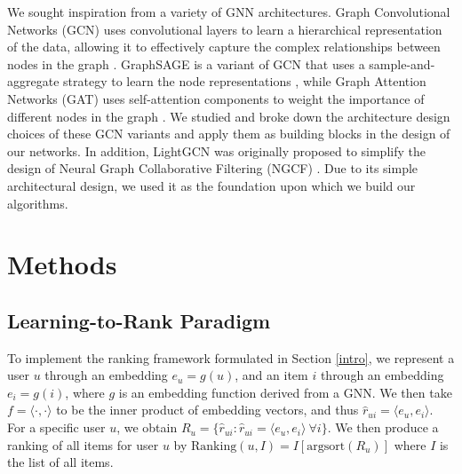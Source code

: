 \documentclass{article}
\begin{document}
We sought inspiration from a variety of GNN architectures. Graph Convolutional Networks (GCN) uses convolutional layers to learn a hierarchical representation of the data, allowing it to effectively capture the complex relationships between nodes in the graph \cite{gcn}. GraphSAGE is a variant of GCN that uses a sample-and-aggregate strategy to learn the node representations \cite{graphsage}, while Graph Attention Networks (GAT) uses self-attention components to weight the importance of different nodes in the graph \cite{gat}. We studied and broke down the architecture design choices of these GCN variants and apply them as building blocks in the design of our networks. In addition, LightGCN \cite{lightgcn} was originally proposed to simplify the design of Neural Graph Collaborative Filtering (NGCF) \cite{ngcf}. Due to its simple architectural design, we used it as the foundation upon which we build our algorithms.

\section{Methods}


\subsection{Learning-to-Rank Paradigm}


To implement the ranking framework formulated in Section \ref{intro}, we represent a user $u$ through an embedding $e_u=g(u)$, and an item $i$ through an embedding $e_i=g(i)$, where $g$ is an embedding function derived from a GNN. We then take $f=\langle\cdot{,}\cdot\rangle$ to be the inner product of embedding vectors, and thus $\hat r_{ui} = \langle e_u {,} e_i \rangle$.
For a specific user $u$, we obtain $R_u =\{\hat r_{ui} : \hat r_{ui}=\langle e_u {,} e_i \rangle ~\forall i \}$. We then produce a ranking of all items for user $u$ by $\text{Ranking}(u, I) = I[\text{argsort}(R_u)]$ where $I$ is the list of all items.
\end{document}
